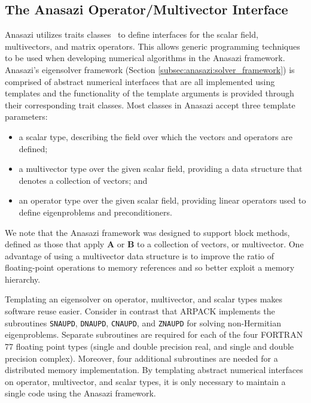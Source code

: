 \documentclass[acmtoms,acmnow]{acmtrans2m}
\newcommand{\aspace}[1]{\texttt{#1}}
\begin{document}

\subsection{The Anasazi Operator/Multivector Interface}
\label{sec:anasazi:opvec}

Anasazi utilizes traits classes~\cite{myer:95,veld:96} to define interfaces for the scalar field,
multivectors, and matrix operators. This allows generic programming techniques to
be used when developing numerical algorithms in the Anasazi framework.  
Anasazi's eigensolver framework (Section  
\ref{subsec:anasazi:solver_framework}) is comprised of abstract numerical interfaces
that are all implemented using templates and the functionality of the 
template arguments is provided through their corresponding trait classes.
Most classes in Anasazi accept
three template parameters:
\begin{itemize}
\item
a scalar type, describing the field over which the vectors and
operators are defined;
\item
a multivector type over the given scalar field, providing a
data structure that denotes a collection of vectors; and
\item
an operator type over the given scalar field,
providing linear operators used to define eigenproblems and
preconditioners.
\end{itemize}

We note that the Anasazi framework was designed to support block methods, defined as those
that apply $\mathbf{A}$ or $\mathbf{B}$ to a collection of vectors, or multivector. One
advantage of using a multivector data structure is to improve the ratio of floating-point
operations to memory references and so better exploit a memory hierarchy.

Templating an eigensolver on operator, multivector, and scalar types makes software reuse
easier. Consider in contrast that ARPACK implements the subroutines \texttt{SNAUPD},
\texttt{DNAUPD}, \texttt{CNAUPD}, and \texttt{ZNAUPD} for solving non-Hermitian
eigenproblems. Separate subroutines are required for each of the four FORTRAN 77 floating
point types (single and double precision real, and single and double precision complex).
Moreover, four additional subroutines are needed for a distributed memory implementation.
By templating abstract numerical interfaces on operator, multivector, and scalar types, 
it is only necessary to maintain a single code using the Anasazi framework.
\end{document}
